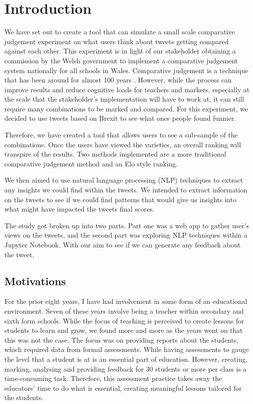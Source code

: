 \chapter{Introduction}
	\label{chap:intro}
	We have set out to create a tool that can simulate a small scale comparative judgement experiment on what users think about tweets getting compared against each other. This experiment is in light of our stakeholder obtaining a commission by the Welsh government to implement a comparative judgement system nationally for all schools in Wales. Comparative judgement is a technique that has been around for almost 100 years \cite{thurstone1927law}. However, while the process can improve results and reduce cognitive loads for teachers and markers, especially at the scale that the stakeholder's implementation will have to work at, it can still require many combinations to be marked and compared. For this experiment, we decided to use tweets based on Brexit to see what ones people found funnier.
	
	Therefore, we have created a tool that allows users to see a sub-sample of the combinations. Once the users have viewed the varieties, an overall ranking will transpire of the results. Two methods implemented are a more traditional comparative judgement method and an Elo style ranking.
	
	We then aimed to use natural language processing (NLP) techniques to extract any insights we could find within the tweets. We intended to extract information on the tweets to see if we could find patterns that would give us insights into what might have impacted the tweets final scores.
	
	The study got broken up into two parts. Part one was a web app to gather user's views on the tweets, and the second part was exploring NLP techniques within a Jupyter Notebook. With our aim to see if we can generate any feedback about the tweet.


	\section{Motivations}
		\label{sec:intro_motivation} 
	For the prior eight years, I have had involvement in some form of an educational environment. Seven of these years involve being a teacher within secondary and sixth form schools. While the focus of teaching is perceived to create lessons for students to learn and grow, we found more and more as the years went on that this was not the case. The focus was on providing reports about the students, which required data from formal assessments. While having assessments to gauge the level that a student is at is an essential part of education. However, creating, marking, analysing and providing feedback for 30 students or more per class is a time-consuming task. Therefore, this assessment practice takes away the educators' time to do what is essential, creating meaningful lessons tailored for the students.
	
